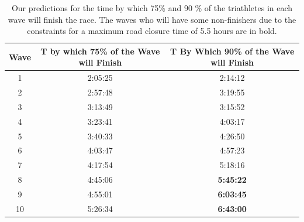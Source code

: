 \documentclass[12pt]{article}
\begin{document}
\begin{table}[H]
\centering
\label{my-label}
\begin{tabular}{|c|c|c|}
\hline
Wave    & T by which 75\% of the Wave will Finish & T By Which 90\% of the Wave will Finish \\\hline
 1  & 2:05:25                                         & 2:14:12                                         \\\hline
 2  & 2:57:48                                         & 3:19:55                                         \\\hline
 3  & 3:13:49                                         & 3:15:52                                         \\\hline
 4  & 3:23:41                                         & 4:03:17                                         \\\hline
 5  & 3:40:33                                         & 4:26:50                                         \\\hline
 6  & 4:03:47                                         & 4:57:23                                         \\\hline
 7  & 4:17:54                                         & 5:18:16                                         \\\hline
 8  & 4:45:06                                         & \textbf{5:45:22}                                \\\hline
 9  & 4:55:01                                         & \textbf{6:03:45}                                \\\hline
 10 & 5:26:34                                         & \textbf{6:43:00}                                \\\hline
\end{tabular}
\caption{Our predictions for the time by which 75\%  and 90 \% of the triathletes in each wave will finish the race. The waves who will have some non-finishers due to the constraints for a maximum road closure time of 5.5 hours are in bold.}
\end{table}
\end{document}
